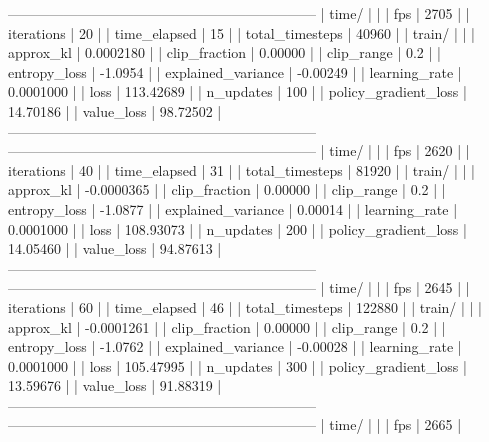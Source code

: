 ------------------------------------------------------------------
| time/                   |              |
|    fps                  |         2705 |
|    iterations           |           20 |
|    time_elapsed         |           15 |
|    total_timesteps      |        40960 |
| train/                  |              |
|    approx_kl            |    0.0002180 |
|    clip_fraction        |      0.00000 |
|    clip_range           |          0.2 |
|    entropy_loss         |      -1.0954 |
|    explained_variance   |     -0.00249 |
|    learning_rate        |    0.0001000 |
|    loss                 |    113.42689 |
|    n_updates            |          100 |
|    policy_gradient_loss |     14.70186 |
|    value_loss           |     98.72502 |
------------------------------------------------------------------
------------------------------------------------------------------
| time/                   |              |
|    fps                  |         2620 |
|    iterations           |           40 |
|    time_elapsed         |           31 |
|    total_timesteps      |        81920 |
| train/                  |              |
|    approx_kl            |   -0.0000365 |
|    clip_fraction        |      0.00000 |
|    clip_range           |          0.2 |
|    entropy_loss         |      -1.0877 |
|    explained_variance   |      0.00014 |
|    learning_rate        |    0.0001000 |
|    loss                 |    108.93073 |
|    n_updates            |          200 |
|    policy_gradient_loss |     14.05460 |
|    value_loss           |     94.87613 |
------------------------------------------------------------------
------------------------------------------------------------------
| time/                   |              |
|    fps                  |         2645 |
|    iterations           |           60 |
|    time_elapsed         |           46 |
|    total_timesteps      |       122880 |
| train/                  |              |
|    approx_kl            |   -0.0001261 |
|    clip_fraction        |      0.00000 |
|    clip_range           |          0.2 |
|    entropy_loss         |      -1.0762 |
|    explained_variance   |     -0.00028 |
|    learning_rate        |    0.0001000 |
|    loss                 |    105.47995 |
|    n_updates            |          300 |
|    policy_gradient_loss |     13.59676 |
|    value_loss           |     91.88319 |
------------------------------------------------------------------
------------------------------------------------------------------
| time/                   |              |
|    fps                  |         2665 |
